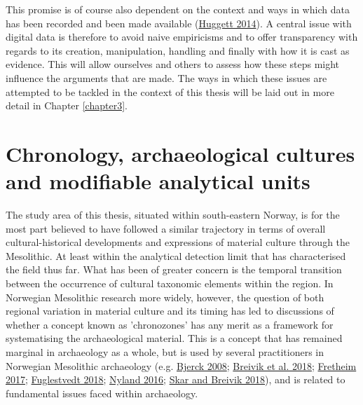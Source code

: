\documentclass[
  12pt,
  a4paper,
  oneside]{book}
\begin{document}
This promise is of course also dependent on the context and ways in which data has been recorded and been made available (\protect\hyperlink{ref-huggett2014}{Huggett 2014}). A central issue with digital data is therefore to avoid naive empiricisms and to offer transparency with regards to its creation, manipulation, handling and finally with how it is cast as evidence. This will allow ourselves and others to assess how these steps might influence the arguments that are made. The ways in which these issues are attempted to be tackled in the context of this thesis will be laid out in more detail in Chapter \ref{chapter3}.

\hypertarget{chronology-archaeological-cultures-and-modifiable-analytical-units}{%
\section{Chronology, archaeological cultures and modifiable analytical units}\label{chronology-archaeological-cultures-and-modifiable-analytical-units}}


The study area of this thesis, situated within south-eastern Norway, is for the most part believed to have followed a similar trajectory in terms of overall cultural-historical developments and expressions of material culture through the Mesolithic. At least within the analytical detection limit that has characterised the field thus far. What has been of greater concern is the temporal transition between the occurrence of cultural taxonomic elements within the region. In Norwegian Mesolithic research more widely, however, the question of both regional variation in material culture and its timing has led to discussions of whether a concept known as 'chronozones' has any merit as a framework for systematising the archaeological material. This is a concept that has remained marginal in archaeology as a whole, but is used by several practitioners in Norwegian Mesolithic archaeology (e.g. \protect\hyperlink{ref-bjerck2008}{Bjerck 2008}; \protect\hyperlink{ref-breivik2018}{Breivik et al. 2018}; \protect\hyperlink{ref-fretheim2017}{Fretheim 2017}; \protect\hyperlink{ref-fuglestvedt2018}{Fuglestvedt 2018}; \protect\hyperlink{ref-nyland2016}{Nyland 2016}; \protect\hyperlink{ref-skar2018}{Skar and Breivik 2018}), and is related to fundamental issues faced within archaeology.
\end{document}
